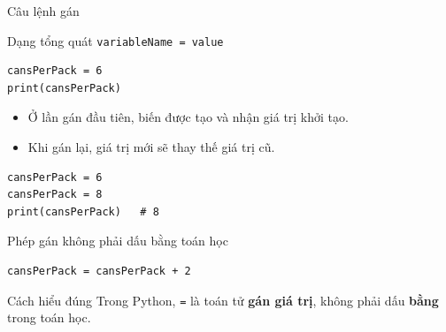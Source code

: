 \documentclass[aspectratio=169,10pt]{beamer}
\begin{document}
\begin{frame}[fragile]{Câu lệnh gán}
\begin{block}{Dạng tổng quát}
\texttt{variableName = value}
\end{block}
\begin{lstlisting}
cansPerPack = 6
print(cansPerPack)
\end{lstlisting}
\begin{itemize}
  \item Ở lần gán đầu tiên, biến được tạo và nhận giá trị khởi tạo.
  \item Khi gán lại, giá trị mới sẽ thay thế giá trị cũ.
\end{itemize}
\begin{lstlisting}
cansPerPack = 6
cansPerPack = 8
print(cansPerPack)   # 8
\end{lstlisting}
\end{frame}

\begin{frame}[fragile]{Phép gán không phải dấu bằng toán học}
\begin{lstlisting}
cansPerPack = cansPerPack + 2
\end{lstlisting}
\begin{center}
\end{center}
\begin{alertblock}{Cách hiểu đúng}
Trong Python, \texttt{=} là toán tử \textbf{gán giá trị}, không phải dấu \textbf{bằng} trong toán học.
\end{alertblock}
\end{frame}
\end{document}
